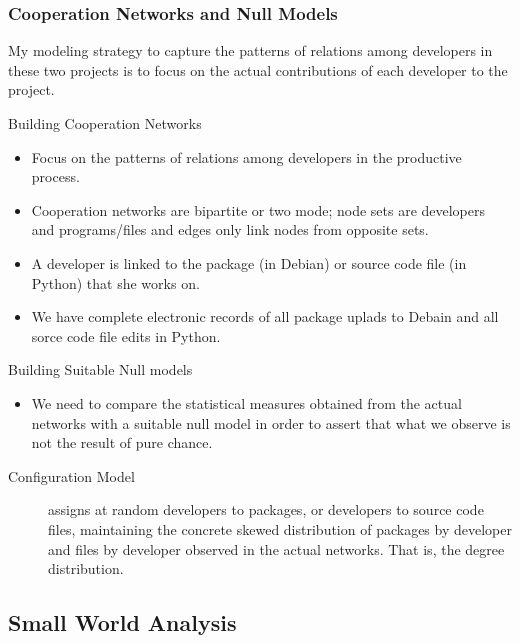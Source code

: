 \documentclass[ignorenonframetext,red,8pt,notes=show]{beamer}
\begin{document}
\begin{frame}
\frametitle{Cooperation Networks and Null Models}

My modeling strategy to capture the patterns of relations among developers in these two projects is to focus on the actual contributions of each developer to the project. 

\begin{block}{Building Cooperation Networks}
\begin{itemize}
\item Focus on the patterns of relations among developers in the productive process.
\item Cooperation networks are bipartite or two mode; node sets are developers and programs/files and edges only link nodes from opposite sets.
\item A developer is linked to the package (in Debian) or source code file (in Python) that she works on.
\item We have complete electronic records of all package uplads to Debain and all sorce code file edits in Python.
\end{itemize}
\end{block}

\begin{block}{Building Suitable Null models}
\begin{itemize}
\item We need to compare the statistical measures obtained from the actual networks with a suitable null model in order to assert that what we observe is not the result of pure chance.
\end{itemize}
\begin{description}
\item [Configuration Model] assigns at random developers to packages, or developers to source code files, maintaining the concrete skewed distribution of packages by developer and files by developer observed in the actual networks. That is, the degree distribution.
\end{description}
\end{block}

\end{frame}

\subsection{Small World Analysis}
\end{document}
